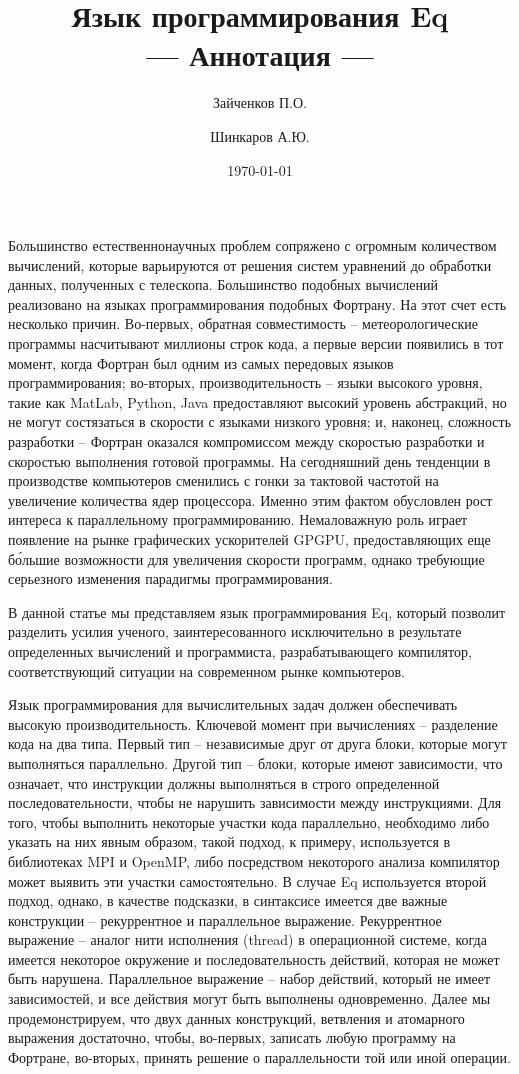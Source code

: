 \documentclass[a4paper]{llncs}
\author{Зайченков П.О.\inst{1} \and Шинкаров А.Ю.\inst{2}}
\date{\today}
\title{Язык программирования Eq \\
      --- Аннотация ---}
\institute{
  Московский физико-технический институт,
  Кафедра информатики и вычислительной техники
\and
  University of Hertfordshire,
  Hatfield, Hertfordshire,
  AL10 9AB, United Kingdom
}
\begin{document}
\maketitle

Большинство естественнонаучных проблем сопряжено с
огромным количеством вычислений, которые варьируются от решения систем 
уравнений до обработки данных, полученных с 
телескопа.  Большинство подобных 
вычислений реализовано на языках программирования подобных Фортрану. На этот счет есть несколько причин.
Во-первых, обратная совместимость -- метеорологические программы насчитывают 
миллионы строк кода, а первые версии появились в тот момент, когда Фортран был одним из самых
передовых языков программирования; во-вторых, производительность --
языки высокого уровня, такие как MatLab, Python, Java предоставляют
высокий уровень абстракций, но не могут состязаться в скорости с
языками низкого уровня; и, наконец, сложность разработки -- Фортран
оказался компромиссом между скоростью разработки и скоростью
выполнения готовой программы. На сегодняшний день тенденции в производстве компьютеров сменились с 
гонки за тактовой частотой на увеличение количества ядер процессора.  
Именно этим фактом обусловлен рост интереса к параллельному программированию.  
Немаловажную роль играет появление на рынке графических ускорителей GPGPU,
предоставляющих еще б\'{о}льшие возможности для увеличения скорости
программ, однако требующие серьезного изменения парадигмы
программирования.

В данной статье мы представляем язык программирования Eq, который
позволит разделить усилия ученого, заинтересованного исключительно в
результате определенных вычислений и программиста, разрабатывающего
компилятор, соответствующий ситуации на современном рынке компьютеров.

Язык программирования для вычислительных задач должен обеспечивать высокую
производительность.  Ключевой момент при вычислениях --
разделение кода на два типа.  Первый тип -- независимые друг от друга блоки, которые могут выполняться параллельно.  Другой тип -- блоки, которые имеют зависимости, что означает, что инструкции
должны выполняться в строго определенной последовательности, чтобы не нарушить
зависимости между инструкциями.  Для того, чтобы выполнить некоторые участки
кода параллельно, необходимо либо указать на них явным образом, 
такой подход, к примеру, используется в 
библиотеках MPI и OpenMP, либо посредством некоторого анализа компилятор может 
выявить эти участки самостоятельно.  В случае Eq используется второй подход, 
однако, в качестве подсказки, в синтаксисе имеется две важные конструкции --
рекуррентное и параллельное выражение.  Рекуррентное выражение -- аналог нити 
исполнения (thread) в операционной системе, когда имеется некоторое окружение 
и последовательность действий, которая не может быть нарушена.  Параллельное 
выражение -- набор действий, который не имеет  зависимостей, и все действия 
могут быть выполнены одновременно.  Далее мы продемонстрируем, что двух данных 
конструкций, ветвления и атомарного выражения достаточно, чтобы, во-первых, 
записать любую программу на Фортране, во-вторых, принять решение о 
параллельности той или иной операции.
\end{document}
